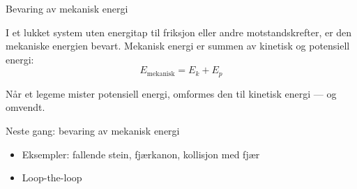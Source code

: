 \documentclass[aspectratio=169, 12pt]{beamer}
\begin{document}
\begin{frame}{Bevaring av mekanisk energi}

  I et lukket system uten energitap til friksjon eller andre motstandskrefter, er den mekaniske energien bevart. Mekanisk energi er summen av kinetisk og potensiell energi:
  \[
    E_{\text{mekanisk}} = E_k + E_p
  \]

  \pause
  Når et legeme mister potensiell energi, omformes den til kinetisk energi --- og omvendt.

\end{frame}

\begin{frame}{}


\end{frame}

\begin{frame}
\begin{center}
  \Huge{Neste gang: bevaring av mekanisk energi}
  \begin{itemize}
    \item Eksempler: fallende stein, fjærkanon, kollisjon med fjær
    \item Loop-the-loop
  \end{itemize}
  \vspace{6mm}
\end{center}
\end{frame}
\end{document}
